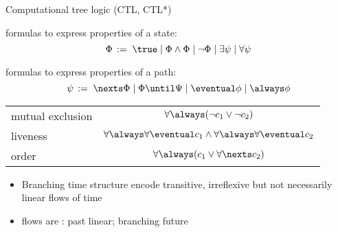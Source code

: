 \documentclass{beamer}
\begin{document}
\begin{slide}{Computational tree logic (CTL, CTL*)}\label{s:45}
\small

  formulas to express  properties of a state:
\[
\Phi\, := \; \true \mid \Phi \wedge \Phi \mid \neg \Phi \mid \exists \psi \mid \forall \psi
\]


 formulas to express properties of a path:
\[
\psi\, := \; \nexts \Phi \mid  \Phi \until \Psi
             \mid \eventual \phi \mid \always \phi
\]

\vspace{0.2cm}
\begin{center}
\begin{tabular}{|l|c|}
\hline
mutual exclusion  & $\forall \always (\neg c_1 \vee \neg c_2)$ \\
 liveness & $\forall \always \forall \eventual c_1 \wedge \forall \always \forall  \eventual c_2$\\
order  & $\forall \always (c_1 \vee \forall\nexts c_2)$\\
\hline
\end{tabular}  
\end{center}

\begin{itemize}
\item Branching time structure encode transitive, irreflexive but not necessarily linear flows of time
\item flows are : past linear; branching future
\end{itemize}
\end{slide}
\end{document}
